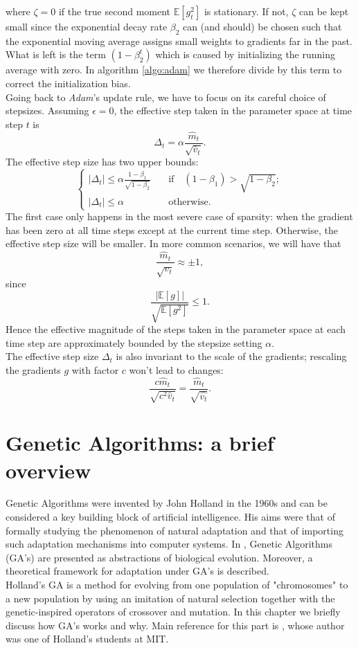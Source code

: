 \documentclass[%
    corpo=11pt,
    twoside,
    stile=classica,
    oldstyle,
    autoretitolo,
    tipotesi=magistrale,
    greek,
    evenboxes,
    english
]{toptesi}
\begin{document}
where $\zeta = 0$ if the true second moment $\mathbb{E}\left[g_t^2 \right]$ is stationary. If not, $\zeta$ can be kept small since the exponential decay rate $\beta_2$ can (and should) be chosen such that the exponential moving average assigns small weights to gradients far in the past. What is left is the term $(1 - \beta_2^t)$ which is caused by initializing the running average with zero. In algorithm \ref{algo:adam} we therefore divide by this term to correct the initialization bias. \\
Going back to \textit{Adam}'s update rule, we have to focus on its careful choice of stepsizes. Assuming $\epsilon = 0$, the effective step taken in the parameter space at time step $t$ is 
\begin{equation}
\Delta_t = \alpha\frac{\hat{m}_t}{\sqrt{\hat{v}_t}}.
\end{equation}
The effective step size has two upper bounds:
\begin{equation}
\begin{cases}
|\Delta_t| \leq \alpha\frac{1 - \beta_1}{\sqrt{1 - \beta_2}} \quad &\text{if} \quad (1-\beta_1) > \sqrt{1 - \beta_2}; \\
|\Delta_t| \leq \alpha \quad &\text{otherwise.}
\end{cases}
\end{equation}
The first case only happens in the most severe case of sparsity: when the gradient has been zero at all time steps except at the current time step. Otherwise, the effective step size will be smaller. In more common scenarios, we will have that 
$$\frac{\hat{m}_t}{\sqrt{v_t}} \approx \pm 1,$$
since 
$$\frac{|\mathbb{E}\left[g\right]|}{\sqrt{\mathbb{E}\left[g^2 \right]}}\leq 1.$$
Hence the effective magnitude of the steps taken in the parameter space at each time step are approximately bounded by the stepsize setting $\alpha$. \\
The effective step size $\Delta_t$ is also invariant to the scale of the gradients; rescaling the gradients $g$ with factor $c$ won't lead to changes:
\begin{equation}
\frac{c\hat{m}_t}{\sqrt{c^2\hat{v}_t}} = \frac{\hat{m}_t}{\sqrt{\hat{v_t}}}.
\end{equation}
\chapter{Genetic Algorithms: a brief overview}
Genetic Algorithms were invented by John Holland in the 1960s and can be considered a key building block of artificial intelligence. His aims were that of  formally studying the phenomenon of natural adaptation and that of importing such adaptation mechanisms into computer systems. In \cite{holland}, Genetic Algorithms (GA's) are presented as abstractions of biological evolution. Moreover, a theoretical framework for adaptation under GA's is described. \\
Holland's GA is a method for evolving from one population of "chromosomes" to a new population by using an imitation of natural selection together with the genetic-inspired operators of crossover and mutation. In this chapter we briefly discuss how GA's works and why. Main reference for this part is \cite{mit}, whose author was one of Holland's students at MIT.
\end{document}
